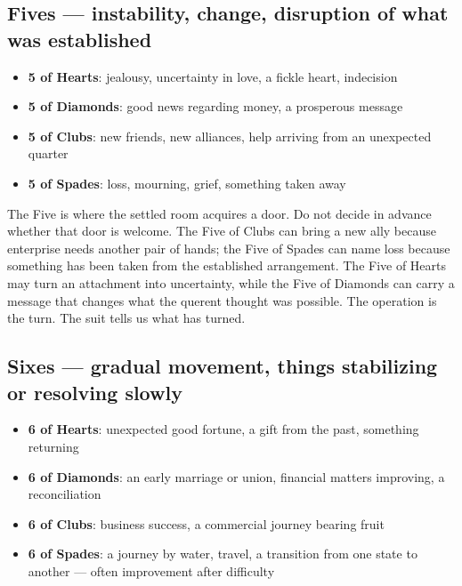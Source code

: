 \subsection{Fives --- instability, change, disruption of what was established}\label{fives--instability-change-disruption-of-what-was-established}

\begin{itemize}
\tightlist
\item
  \textbf{5 of Hearts}: jealousy, uncertainty in love, a fickle heart, indecision
\item
  \textbf{5 of Diamonds}: good news regarding money, a prosperous message
\item
  \textbf{5 of Clubs}: new friends, new alliances, help arriving from an unexpected quarter
\item
  \textbf{5 of Spades}: loss, mourning, grief, something taken away
\end{itemize}

The Five is where the settled room acquires a door. Do not decide in advance
whether that door is welcome. The Five of Clubs can bring a new ally because
enterprise needs another pair of hands; the Five of Spades can name loss because
something has been taken from the established arrangement. The Five of Hearts
may turn an attachment into uncertainty, while the Five of Diamonds can carry a
message that changes what the querent thought was possible. The operation is the
turn. The suit tells us what has turned.

\subsection{Sixes --- gradual movement, things stabilizing or resolving slowly}\label{sixes--gradual-movement-things-stabilizing-or-resolving-slowly}

\begin{itemize}
\tightlist
\item
  \textbf{6 of Hearts}: unexpected good fortune, a gift from the past, something returning
\item
  \textbf{6 of Diamonds}: an early marriage or union, financial matters improving, a reconciliation
\item
  \textbf{6 of Clubs}: business success, a commercial journey bearing fruit
\item
  \textbf{6 of Spades}: a journey by water, travel, a transition from one state to another --- often improvement after difficulty
\end{itemize}

